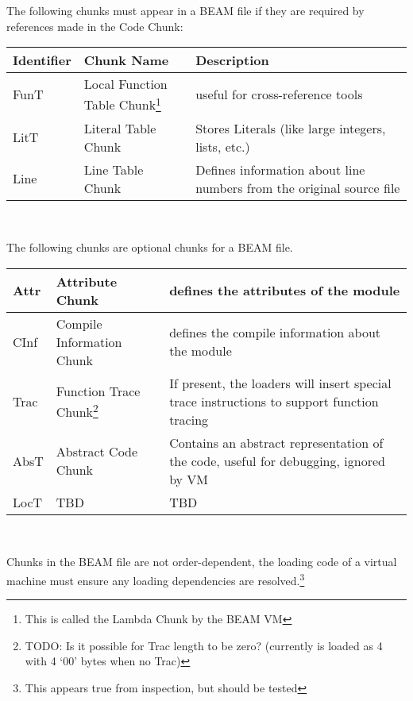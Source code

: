 \documentclass{article}
\begin{document}
The following chunks must appear in a BEAM file if they are required by references made in the Code Chunk:\\
\begin{savenotes}
\begin{tabular}{ |l|l|p{3.5in}| } \hline
Identifier & Chunk Name                 & Description \\ \hline
FunT       & Local Function Table Chunk\footnote{This is called the Lambda Chunk by the BEAM VM} & useful for cross-reference tools \\ \hline
LitT       & Literal Table Chunk        & Stores Literals (like large integers, lists, etc.) \\ \hline
Line       & Line Table Chunk           & Defines information about line numbers from the original source file \\ \hline
\end{tabular}\\
\end{savenotes}

The following chunks are optional chunks for a BEAM file.\\
\begin{savenotes}
\begin{tabular}{ |l|l|p{3.5in}| } \hline
Attr       & Attribute Chunk            & defines the attributes of the module \\ \hline
CInf       & Compile Information Chunk  & defines the compile information about the module \\ \hline
Trac       & Function Trace Chunk\footnote{TODO: Is it possible for Trac length to be zero? (currently is loaded as 4 with 4 `00' bytes when no Trac)}
                                        & If present, the loaders will insert special trace instructions to support function tracing \\ \hline
AbsT       & Abstract Code Chunk        & Contains an abstract representation of the code, useful for debugging, ignored by VM \\ \hline
LocT       & TBD                        & TBD\\ \hline
\end{tabular}\\
\end{savenotes}

Chunks in the BEAM file are not order-dependent, the loading
code of a virtual machine must ensure any loading dependencies are resolved.\footnote{This appears true from inspection, but should be tested}
\end{document}
